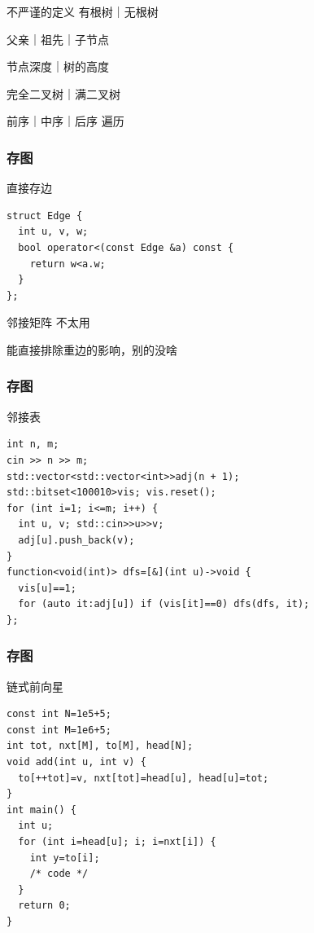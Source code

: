 \documentclass{beamer}
\begin{document}
  \begin{frame}{不严谨的定义}
    有根树｜无根树

    父亲｜祖先｜子节点

    节点深度｜树的高度

    完全二叉树｜满二叉树

    前序｜中序｜后序 遍历
  \end{frame}

  \begin{frame}[fragile]
    \frametitle{存图}
    \begin{block}{直接存边}
      \begin{lstlisting}
struct Edge {
  int u, v, w;
  bool operator<(const Edge &a) const {
    return w<a.w;
  }
};
      \end{lstlisting}
    \end{block}

    \pause

    \begin{block}{邻接矩阵}
      不太用

      能直接排除重边的影响，别的没啥
    \end{block}
  \end{frame}

  \begin{frame}[fragile]
    \frametitle{存图}
      \begin{block}{邻接表}
        \begin{lstlisting}          
int n, m;
cin >> n >> m;
std::vector<std::vector<int>>adj(n + 1);
std::bitset<100010>vis; vis.reset();
for (int i=1; i<=m; i++) {
  int u, v; std::cin>>u>>v;
  adj[u].push_back(v);
}
function<void(int)> dfs=[&](int u)->void {
  vis[u]==1;
  for (auto it:adj[u]) if (vis[it]==0) dfs(dfs, it);
};
            \end{lstlisting}
      \end{block}
  \end{frame}

  \begin{frame}[fragile]
    \frametitle{存图}
      \begin{block}{链式前向星}
        \begin{lstlisting}
const int N=1e5+5;
const int M=1e6+5;
int tot, nxt[M], to[M], head[N];
void add(int u, int v) {
  to[++tot]=v, nxt[tot]=head[u], head[u]=tot;
}
int main() {
  int u;
  for (int i=head[u]; i; i=nxt[i]) {
    int y=to[i];
    /* code */
  }
  return 0;
}
        \end{lstlisting}
      \end{block}
  \end{frame}
\end{document}
